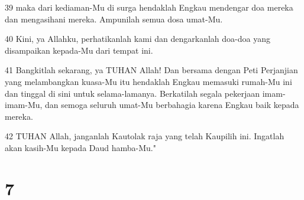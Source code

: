 \par 39 maka dari kediaman-Mu di surga hendaklah Engkau mendengar doa mereka dan mengasihani mereka. Ampunilah semua dosa umat-Mu.
\par 40 Kini, ya Allahku, perhatikanlah kami dan dengarkanlah doa-doa yang disampaikan kepada-Mu dari tempat ini.
\par 41 Bangkitlah sekarang, ya TUHAN Allah! Dan bersama dengan Peti Perjanjian yang melambangkan kuasa-Mu itu hendaklah Engkau memasuki rumah-Mu ini dan tinggal di sini untuk selama-lamanya. Berkatilah segala pekerjaan imam-imam-Mu, dan semoga seluruh umat-Mu berbahagia karena Engkau baik kepada mereka.
\par 42 TUHAN Allah, janganlah Kautolak raja yang telah Kaupilih ini. Ingatlah akan kasih-Mu kepada Daud hamba-Mu."

\chapter{7}

